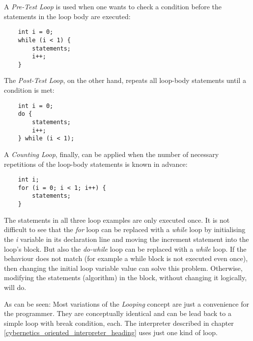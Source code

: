 A \emph{Pre-Test Loop} is used when one wants to check a condition before the
statements in the loop body are executed:

\begin{scriptsize}
    \begin{verbatim}
    int i = 0;
    while (i < 1) {
        statements;
        i++;
    }
    \end{verbatim}
\end{scriptsize}

The \emph{Post-Test Loop}, on the other hand, repeats all loop-body statements
until a condition is met:

\begin{scriptsize}
    \begin{verbatim}
    int i = 0;
    do {
        statements;
        i++;
    } while (i < 1);
    \end{verbatim}
\end{scriptsize}

A \emph{Counting Loop}, finally, can be applied when the number of necessary
repetitions of the loop-body statements is known in advance:

\begin{scriptsize}
    \begin{verbatim}
    int i;
    for (i = 0; i < 1; i++) {
        statements;
    }
    \end{verbatim}
\end{scriptsize}

The statements in all three loop examples are only executed once. It is not
difficult to see that the \emph{for} loop can be replaced with a \emph{while}
loop by initialising the \emph{i} variable in its declaration line and moving
the increment statement into the loop's block. But also the \emph{do-while}
loop can be replaced with a \emph{while} loop. If the behaviour does not match
(for example a while block is not executed even once), then changing the initial
loop variable value can solve this problem. Otherwise, modifying the statements
(algorithm) in the block, without changing it logically, will do.

As can be seen: Most variations of the \emph{Looping} concept are just a
convenience for the programmer. They are conceptually identical and can be lead
back to a simple loop with break condition, each. The interpreter described in
chapter \ref{cybernetics_oriented_interpreter_heading} uses just one kind of
loop.
